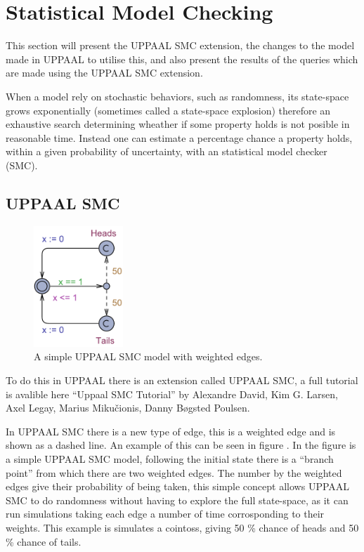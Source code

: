 \section{Statistical Model Checking}

This section will present the UPPAAL SMC extension, the changes to the model made in UPPAAL to utilise this, and also present the results of the queries which are made using the UPPAAL SMC extension.

When a model rely on stochastic behaviors, such as randomness, its state-space grows exponentially (sometimes called a state-space explosion) therefore an exhaustive search determining wheather if some property holds is not posible in reasonable time. 
Instead one can estimate a percentage chance a property holds, within a given probability of uncertainty, with an statistical model checker (SMC). 

\subsection{UPPAAL SMC}
\begin{figure}
\centering
  \includegraphics[width=0.3\textwidth]{Figures/Model/Simple_SMC.pdf} 
\caption{A simple UPPAAL SMC model with weighted edges. }
\label{fig:simpleSMC}
\end{figure}

To do this in UPPAAL there is an extension called UPPAAL SMC, a full tutorial is avalible here ``Uppaal SMC Tutorial''\cite{DBLP:journals/sttt/DavidLLMP15} by Alexandre David, Kim G. Larsen, Axel Legay, Marius Miku\v{c}ionis, Danny B\o gsted Poulsen.

In UPPAAL SMC there is a new type of edge, this is a weighted edge and is shown as a dashed line. 
An example of this can be seen in figure . 
In the figure is a simple UPPAAL SMC model, following the initial state there is a ``branch point'' from which there are two weighted edges.
The number by the weighted edges give their probability of being taken, this simple concept allows UPPAAL SMC to do randomness without having to explore the full state-space, as it can run simulations taking each edge a number of time corrosponding to their weights. 
This example is simulates a cointoss, giving 50 \% chance of heads and 50 \% chance of tails. 

